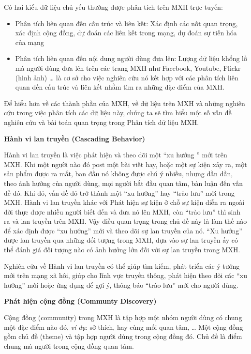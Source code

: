 \documentclass[12pt]{extarticle}
\begin{document}
			\par Có hai kiểu dữ liệu chủ yếu thường được phân tích trên MXH trực tuyến:
			\begin{itemize}
				\item{Phân tích liên quan đến cấu trúc và liên kết: Xác định các nốt quan trọng, xác định cộng đồng, dự đoán các liên kết trong mạng, dự đoán sự tiến hóa của mạng}	
				\item{Phân tích liên quan đến nội dung người dùng đưa lên: Lượng dữ liệu khổng lồ mà người dùng đưa lên trên các trang MXH như Facebook, Youtube, Flickr (hình ảnh) … là cơ sở cho việc nghiên cứu nó kết hợp với các phân tích liên quan đến cấu trúc và liên kết nhằm tìm ra những đặc điểm của MXH.}
			\end{itemize}

			\par Để hiểu hơn về các thành phần của MXH, về dữ liệu trên MXH và những nghiên cứu trong việc phân tích các dữ liệu này, chúng ta sẽ tìm hiểu một số vấn đề nghiên cứu và bài toán quan trọng trong Phân tích dữ liệu MXH. 
			\par \textbf{Hành vi lan truyền (Cascading Behavior)}
			\par Hành vi lan truyền là việc phát hiện và theo dõi một “xu hướng ” mới trên MXH. Khi một người nào đó post một bài viết hay, hoặc một sự kiện xảy ra, một sản phẩm được ra mắt, ban đầu nó không được chú ý nhiều, nhưng dần dần, theo ảnh hưởng của người dùng, mọi người bắt đầu quan tâm, bàn luận đến vấn đề đó. Khi đó, vấn đề đó trở thành một “xu hướng” hay “trào lưu” mới trong MXH. Hành vi lan truyền khác với Phát hiện sự kiện ở chỗ sự kiện diễn ra ngoài đời thực được nhiều người biết đến và đưa nó lên MXH, còn “trào lưu” thì sinh ra và lan truyền trên MXH. Vậy điều quan trọng trong chủ đề này là làm thế nào để xác định được “xu hướng” mới và theo dõi sự lan truyền của nó. “Xu hướng” được lan truyền qua những đối tượng trong MXH, dựa vào sự lan truyền ấy có thể đánh giá đối tượng nào có ảnh hưởng lớn đối với sự lan truyền trong MXH.
			\par Nghiên cứu về Hành vi lan truyền có thể giúp tìm kiếm, phát triển các ý tưởng mới trên mạng xã hôi, giúp cho lĩnh vực truyền thông, phát hiện theo dõi các “xu hướng” mới hoặc ứng dụng để gợi ý, thông báo “trào lưu” mới cho người dùng.
			\par \textbf{Phát hiện cộng đồng (Communty Discovery)}
			\par Cộng đồng (community) trong MXH là tập hợp một nhóm người dùng có chung một đặc điểm nào đó, \textit{ví dụ}: sở thích, hay cùng mối quan tâm, …  Một cộng đồng gồm chủ đề (theme) và tập hợp người dùng trong cộng đồng đó. Chủ đề là điểm chung mà người trong cộng đồng quan tâm.
\end{document}
